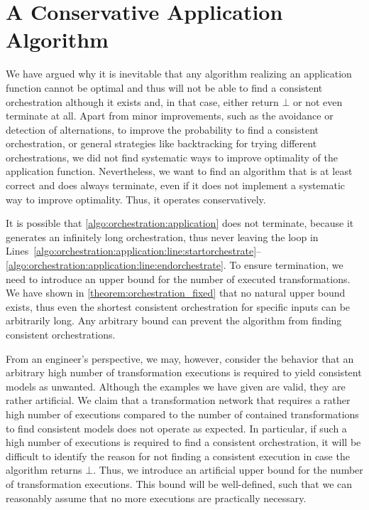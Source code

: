 \section{A Conservative Application Algorithm}
\label{chap:orchestration:algorithm}

We have argued why it is inevitable that any algorithm realizing an application function cannot be optimal and thus will not be able to find a consistent orchestration although it exists and, in that case, either return $\bot$ or not even terminate at all.
Apart from minor improvements, such as the avoidance or detection of alternations, to improve the probability to find a consistent orchestration, or general strategies like backtracking for trying different orchestrations, we did not find systematic ways to improve optimality of the application function.
Nevertheless, we want to find an algorithm that is at least correct and does always terminate, even if it does not implement a systematic way to improve optimality.
Thus, it operates conservatively.

It is possible that \autoref{algo:orchestration:application} does not terminate, because it generates an infinitely long orchestration, thus never leaving the loop in Lines~\ref{algo:orchestration:application:line:startorchestrate}--\ref{algo:orchestration:application:line:endorchestrate}.
To ensure termination, we need to introduce an upper bound for the number of executed transformations.
We have shown in \autoref{theorem:orchestration_fixed} that no natural upper bound exists, thus even the shortest consistent orchestration for specific inputs can be arbitrarily long.
Any arbitrary bound can prevent the algorithm from finding consistent orchestrations.

From an engineer's perspective, we may, however, consider the behavior that an arbitrary high number of transformation executions is required to yield consistent models as unwanted.
Although the examples we have given are valid, they are rather artificial.
We claim that a transformation network that requires a rather high number of executions compared to the number of contained transformations to find consistent models does not operate as expected.
In particular, if such a high number of executions is required to find a consistent orchestration, it will be difficult to identify the reason for not finding a consistent execution in case the algorithm returns $\bot$.
Thus, we introduce an artificial upper bound for the number of transformation executions.
This bound will be well-defined, such that we can reasonably assume that no more executions are practically necessary.

